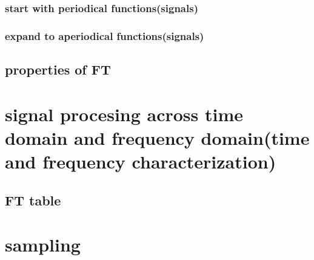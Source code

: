 \documentclass[11pt]{article}
\begin{document}
\subsubsection{start with periodical functions(signals)}
\label{sec:org2be85aa}
\subsubsection{expand to aperiodical functions(signals)}
\label{sec:orgd81f721}
\subsection{properties of FT}
\label{sec:orgb9ced57}
\section{signal procesing across time domain and frequency domain(time and frequency characterization)}
\label{sec:orgec75c5c}
\subsection{FT table}
\label{sec:org341e930}
\section{sampling}
\label{sec:org175009b}
\subsection{}
\label{sec:org51428e4}
\end{document}
